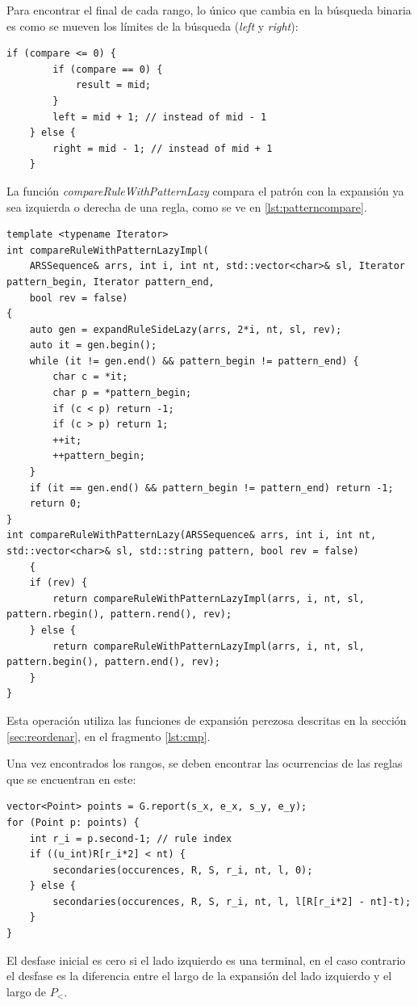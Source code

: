 Para encontrar el final de cada rango, lo único que cambia en la búsqueda binaria es como se mueven los límites de la búsqueda (\textit{left} y \textit{right}):
\begin{lstlisting}[style=cppstyle]
    if (compare <= 0) {
        if (compare == 0) {
            result = mid;
        }
        left = mid + 1; // instead of mid - 1
    } else {
        right = mid - 1; // instead of mid + 1
    }
\end{lstlisting}

La función \textit{compareRuleWithPatternLazy} compara el patrón con la expansión ya sea izquierda o derecha de una regla, como se ve en \ref{lst:patterncompare}.

\begin{lstlisting}[style=cppstyle, caption={Ocurrencias}, label={lst:patterncompare}]
template <typename Iterator>
int compareRuleWithPatternLazyImpl(
    ARSSequence& arrs, int i, int nt, std::vector<char>& sl, Iterator pattern_begin, Iterator pattern_end,
    bool rev = false) 
{      
    auto gen = expandRuleSideLazy(arrs, 2*i, nt, sl, rev);
    auto it = gen.begin();
    while (it != gen.end() && pattern_begin != pattern_end) {
        char c = *it;
        char p = *pattern_begin;
        if (c < p) return -1; 
        if (c > p) return 1;  
        ++it;
        ++pattern_begin;
    }
    if (it == gen.end() && pattern_begin != pattern_end) return -1; 
    return 0; 
}
int compareRuleWithPatternLazy(ARSSequence& arrs, int i, int nt, std::vector<char>& sl, std::string pattern, bool rev = false) 
    {  
    if (rev) {
        return compareRuleWithPatternLazyImpl(arrs, i, nt, sl, pattern.rbegin(), pattern.rend(), rev);
    } else {
        return compareRuleWithPatternLazyImpl(arrs, i, nt, sl, pattern.begin(), pattern.end(), rev);
    }
}
\end{lstlisting}

Esta operación utiliza las funciones de expansión perezosa descritas en la sección \ref{sec:reordenar}, en el fragmento \ref{lst:cmp}.

Una vez encontrados los rangos, se deben encontrar las ocurrencias de las reglas que se encuentran en este:

\begin{lstlisting}[style=cppstyle]
vector<Point> points = G.report(s_x, e_x, s_y, e_y); 
for (Point p: points) {
    int r_i = p.second-1; // rule index
    if ((u_int)R[r_i*2] < nt) { 
        secondaries(occurences, R, S, r_i, nt, l, 0);
    } else {
        secondaries(occurences, R, S, r_i, nt, l, l[R[r_i*2] - nt]-t);
    }
}
\end{lstlisting}
El desfase inicial es cero si el lado izquierdo es una terminal, en el caso contrario el desfase es la diferencia entre el largo de la expansión del lado izquierdo y el largo de $P_<$.

